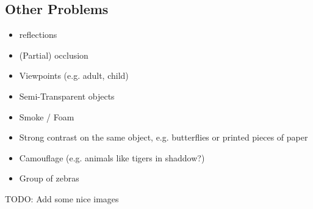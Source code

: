 \subsection{Other Problems}

\begin{itemize}
    \item reflections
    \item (Partial) occlusion
    \item Viewpoints (e.g. adult, child)
    \item Semi-Transparent objects
    \item Smoke / Foam
    \item Strong contrast on the same object, e.g. butterflies or printed
          pieces of paper
    \item Camouflage (e.g. animals like tigers in shaddow?)
    \item Group of zebras
\end{itemize}

TODO: Add some nice images
